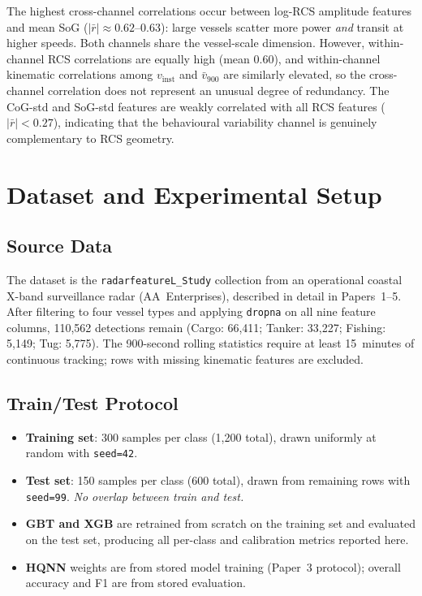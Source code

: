 \documentclass[journal]{IEEEtran}
\begin{document}
The highest cross-channel correlations occur between log-RCS amplitude
features and mean SoG ($|\bar{r}| \approx 0.62$--$0.63$): large
vessels scatter more power \emph{and} transit at higher speeds. Both
channels share the vessel-scale dimension. However, within-channel RCS
correlations are equally high (mean $0.60$), and within-channel
kinematic correlations among $v_{\text{inst}}$ and $\bar{v}_{900}$ are
similarly elevated, so the cross-channel correlation does not represent
an unusual degree of redundancy. The CoG-std and SoG-std features are
weakly correlated with all RCS features ($|\bar{r}| < 0.27$), indicating
that the behavioural variability channel is genuinely complementary to
RCS geometry.

\section{Dataset and Experimental Setup}
\label{sec:data}

\subsection{Source Data}

The dataset is the \texttt{radarfeatureL\_Study} collection from an
operational coastal X-band surveillance radar (AA~Enterprises),
described in detail in Papers~1--5. After filtering to four vessel
types and applying \texttt{dropna} on all nine feature columns,
110,562 detections remain (Cargo: 66,411; Tanker: 33,227;
Fishing: 5,149; Tug: 5,775). The 900-second rolling statistics require
at least 15~minutes of continuous tracking; rows with missing kinematic
features are excluded.

\subsection{Train/Test Protocol}

\begin{itemize}
\item \textbf{Training set}: 300 samples per class (1,200 total),
  drawn uniformly at random with \texttt{seed=42}.
\item \textbf{Test set}: 150 samples per class (600 total), drawn
  from remaining rows with \texttt{seed=99}. \emph{No overlap between
  train and test.}
\item \textbf{GBT and XGB} are retrained from scratch on the training
  set and evaluated on the test set, producing all per-class and
  calibration metrics reported here.
\item \textbf{HQNN} weights are from stored model training (Paper~3
  protocol); overall accuracy and F1 are from stored evaluation.
\end{itemize}
\end{document}
